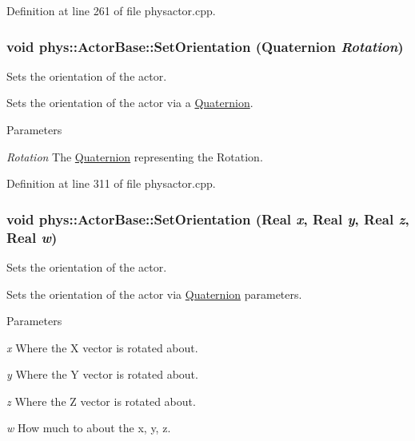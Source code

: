 Definition at line 261 of file physactor.cpp.

\hypertarget{classphys_1_1ActorBase_ac4b0bf1eff730d94f72d04957efea69d}{
\subsubsection[{SetOrientation}]{\setlength{\rightskip}{0pt plus 5cm}void phys::ActorBase::SetOrientation ({\bf Quaternion} {\em Rotation})}}
\label{d8/d0f/classphys_1_1ActorBase_ac4b0bf1eff730d94f72d04957efea69d}


Sets the orientation of the actor. 

Sets the orientation of the actor via a \hyperlink{classphys_1_1Quaternion}{Quaternion}. 
\begin{DoxyParams}{Parameters}
\item[{\em Rotation}]The \hyperlink{classphys_1_1Quaternion}{Quaternion} representing the Rotation. \end{DoxyParams}


Definition at line 311 of file physactor.cpp.

\hypertarget{classphys_1_1ActorBase_adbf0cc77031f22597a799fd0f7f8216d}{
\subsubsection[{SetOrientation}]{\setlength{\rightskip}{0pt plus 5cm}void phys::ActorBase::SetOrientation ({\bf Real} {\em x}, \/  {\bf Real} {\em y}, \/  {\bf Real} {\em z}, \/  {\bf Real} {\em w})}}
\label{d8/d0f/classphys_1_1ActorBase_adbf0cc77031f22597a799fd0f7f8216d}


Sets the orientation of the actor. 

Sets the orientation of the actor via \hyperlink{classphys_1_1Quaternion}{Quaternion} parameters. 
\begin{DoxyParams}{Parameters}
\item[{\em x}]Where the X vector is rotated about. \item[{\em y}]Where the Y vector is rotated about. \item[{\em z}]Where the Z vector is rotated about. \item[{\em w}]How much to about the x, y, z. \end{DoxyParams}


